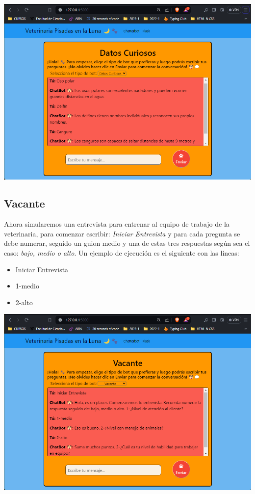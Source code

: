 \begin{center}
    \includegraphics[scale = .5]{IMA/curiosos.png}
\end{center}


\subsection{Vacante}

Ahora simularemos una entrevista para entrenar
al equipo de trabajo de la veterinaria, para 
comenzar escribir: \textit{Iniciar Entrevista} y para cada 
pregunta se debe numerar, seguido un guion medio y una de estas 
tres respuestas según sea el caso: \textit{bajo, medio o alto}. 
Un ejemplo de ejecución es el siguiente con las líneas:

\begin{itemize}    
    \item Iniciar Entrevista
    \item 1-medio
    \item 2-alto
\end{itemize}

\begin{center}
    \includegraphics[scale = .5]{IMA/vacante.png}
\end{center}
